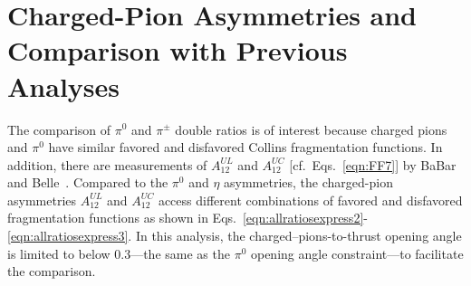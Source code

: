 \section{\texorpdfstring{Charged-Pion Asymmetries and Comparison with Previous Analyses}{Comparison with Previous Analyses}}
\label{sec:comparewpreviouse}

The comparison of $\pi^0$ and $\pi^{\pm}$ double ratios is of interest because charged pions and $\pi^0$ have similar favored and disfavored Collins fragmentation functions. 
In addition, there are measurements of $A^{UL}_{12}$ and $A^{UC}_{12}$ [cf.~Eqs.~\eqref{eqn:FF7}] by BaBar~\cite{BabarCharged} and Belle~\cite{ChargedPionResult2,ChargedPionResult}. 
Compared to the $\pi^0$ and $\eta$ asymmetries, the charged-pion asymmetries $A^{UL}_{12}$ and $A^{UC}_{12}$ access different combinations of favored and disfavored fragmentation functions as shown in Eqs.~\eqref{eqn:allratiosexpress2}-\eqref{eqn:allratiosexpress3}. In this analysis, the charged--pions-to-thrust opening angle is limited to below 0.3---the same as the $\pi^0$ opening angle constraint---to facilitate the comparison.

%


